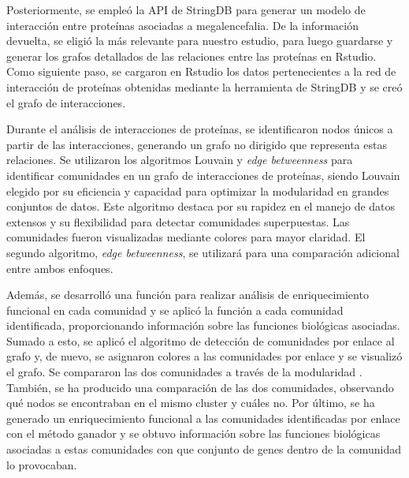 Posteriormente, se empleó la API de StringDB para generar un modelo de interacción entre proteínas asociadas a megalencefalia. De la información devuelta, se eligió la más relevante para nuestro estudio, para luego guardarse y generar los grafos detallados de las relaciones entre las proteínas en Rstudio. \\

Como siguiente paso, se cargaron en Rstudio los datos pertenecientes a la red de interacción de proteínas obtenidas mediante la herramienta de StringDB y se creó el grafo de interacciones.


Durante el análisis de interacciones de proteínas, se identificaron nodos únicos a partir de las interacciones, generando un grafo no dirigido que representa estas relaciones. Se utilizaron los algoritmos Louvain \cite{louvain} y \textit{edge betweenness} \cite{cluster_edge_betweenness} para identificar comunidades en un grafo de interacciones de proteínas, siendo Louvain elegido por su eficiencia y capacidad para optimizar la modularidad en grandes conjuntos de datos. Este algoritmo destaca por su rapidez en el manejo de datos extensos y su flexibilidad para detectar comunidades superpuestas. Las comunidades fueron visualizadas mediante colores para mayor claridad. El segundo algoritmo, \textit{edge betweenness}, se utilizará para una comparación adicional entre ambos enfoques.

Además, se desarrolló una función para realizar análisis de enriquecimiento funcional en cada comunidad y se aplicó la función a cada comunidad identificada, proporcionando información sobre las funciones biológicas asociadas. Sumado a esto, se aplicó el algoritmo de detección de comunidades por enlace al grafo y, de nuevo, se asignaron colores a las comunidades por enlace y se visualizó el grafo. Se compararon las dos comunidades a través de la modularidad \cite{modularity}. También, se ha producido una comparación de las dos comunidades, observando qué nodos se encontraban en el mismo cluster y cuáles no. Por último, se ha generado un enriquecimiento funcional a las comunidades identificadas por enlace con el método ganador y se obtuvo información sobre las funciones biológicas asociadas a estas comunidades con que conjunto de genes dentro de la comunidad lo provocaban.


